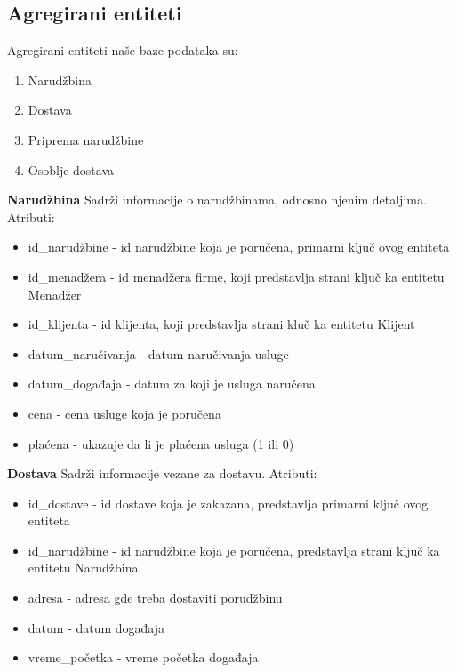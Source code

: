 \documentclass[a4paper]{article}
\begin{document}
\vspace{3mm}

\subsection{Agregirani entiteti}

Agregirani entiteti naše baze podataka su:
\begin{enumerate}
    \item Narudžbina
    \item Dostava
    \item Priprema narudžbine
    \item Osoblje dostava
\end{enumerate}


\vspace{3mm}

\textbf{Narudžbina} Sadrži informacije o narudžbinama, odnosno njenim detaljima. Atributi:
\begin{itemize}
    \item id\_narudžbine - id narudžbine koja je poručena, primarni ključ ovog entiteta
    \item id\_menadžera - id menadžera firme, koji predstavlja strani ključ ka entitetu Menadžer
    \item id\_klijenta - id klijenta, koji predstavlja strani kluč ka entitetu Klijent
    \item datum\_naručivanja - datum naručivanja usluge
    \item datum\_događaja - datum za koji je usluga naručena
    \item cena - cena usluge koja je poručena
    \item plaćena - ukazuje da li je plaćena usluga (1 ili 0)
    
\end{itemize}

\vspace{3mm}



\textbf{Dostava} Sadrži informacije vezane za dostavu. Atributi:
\begin{itemize}
    \item id\_dostave - id dostave koja je zakazana, predstavlja primarni ključ ovog entiteta
    \item id\_narudžbine - id narudžbine koja je poručena, predstavlja strani ključ ka entitetu Narudžbina
    \item adresa - adresa gde treba dostaviti porudžbinu
    \item datum - datum događaja
    \item vreme\_početka - vreme početka događaja
    
\end{itemize}
\end{document}
